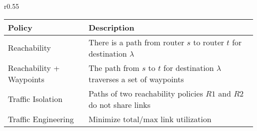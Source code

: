
\begin{wrapfigure}{r}{0.55\textwidth}
\vspace{-7mm}
\begin{minipage}{\linewidth}
	\begin{tabular}{m{5.8em}  m{14em} } 
		{\bf Policy} & {\bf Description} \\ 
		\hline
		Reachability & There is a path from router $s$ to router $t$ for destination $\lambda$ \\ \hline
		Reachability + \newline Waypoints & The path  from $s$ to $t$ for destination $\lambda$ 
		traverses a set of waypoints\\ \hline
		Traffic \newline Isolation & Paths of two reachability policies $R1$ and $R2$ do not share  links \\ \hline
		Traffic \newline Engineering  & Minimize total/max link utilization \\
	\end{tabular}
	\label{tab:policysupport}
	\end{minipage}
\end{wrapfigure}